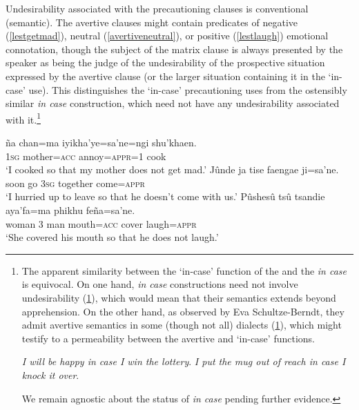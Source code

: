 \documentclass[output=paper,colorlinks,citecolor=brown]{langscibook}
\begin{document}
Undesirability associated with the precautioning  clauses is conventional (semantic). The avertive  clauses might contain predicates of negative (\ref{lestgetmad}), neutral (\ref{avertiveneutral}), or positive (\ref{lestlaugh}) emotional connotation, though the subject of the matrix clause is always presented by the speaker as being the judge of the undesirability of the prospective situation expressed by the avertive  clause (or the larger situation containing it in the `in-case' use). This distinguishes the `in-case' precautioning uses from the ostensibly similar  \textit{in case} construction, which need not have any {undesirability} associated with it.\footnote{The apparent similarity between the `in-case' function of the   and the  \textit{in case} is equivocal. On one hand,  \textit{in case} constructions need not involve undesirability (\ref{incase}), which would mean that their semantics extends beyond apprehension. On the other hand, as observed by Eva Schultze-Berndt, they admit avertive semantics in some (though not all) dialects (\ref{cup}), which might testify to a permeability between the avertive and `in-case' functions.
    \begin{exe}
        \ex \label{incase} \textit{I will be happy in case I win the lottery}.
        \ex \label{cup} \textit{I put the mug out of reach in case I knock it over}.
    \end{exe}
{We remain agnostic about the status of  \textit{in case} pending further evidence.}}
\begin{exe}
    \ex \label{lestgetmad} %
    \gll {\ob}ña    chan=ma    iyikha'ye=sa'ne{\cb}=ngi shu'khaen. \\
         \textsc{1sg} mother=\textsc{acc} annoy=\textsc{appr=1} cook \\
    \glt `I cooked so that my mother does not get mad.'
    \ex \label{avertiveneutral}
    \gll Jûnde ja {\ob}tise faengae ji=sa'ne.{\cb} \\
         soon  go \textsc{3sg} together come=\textsc{appr} \\
    \glt `I hurried up to leave so that he doesn't come with us.'
    \ex \label{lestlaugh} 
    \gll Pûshesû tsû tsandie aya'fa=ma     phikhu {\ob}feña=sa'ne.{\cb} \\
         woman       \textsc{3}     man     mouth=\textsc{acc} cover  laugh=\textsc{appr} \\
    \glt `She covered his mouth so that he does not laugh.'
\end{exe}
\end{document}
